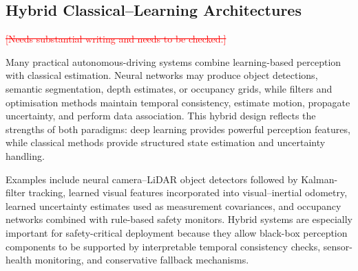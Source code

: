 \documentclass{ieeeaccess}
\newcommand{\deleted}[1]{\textcolor{red}{\sout{#1}}}
\begin{document}
\subsection{Hybrid Classical--Learning Architectures}
\deleted{[Needs substantial writing and needs to be checked.]} %

Many practical autonomous-driving systems combine learning-based perception with classical estimation. Neural networks may produce object detections, semantic segmentation, depth estimates, or occupancy grids, while filters and optimisation methods maintain temporal consistency, estimate motion, propagate uncertainty, and perform data association. This hybrid design reflects the strengths of both paradigms: deep learning provides powerful perception features, while classical methods provide structured state estimation and uncertainty handling.

Examples include neural camera--LiDAR object detectors followed by Kalman-filter tracking, learned visual features incorporated into visual--inertial odometry, learned uncertainty estimates used as measurement covariances, and occupancy networks combined with rule-based safety monitors. Hybrid systems are especially important for safety-critical deployment because they allow black-box perception components to be supported by interpretable temporal consistency checks, sensor-health monitoring, and conservative fallback mechanisms.
\end{document}
